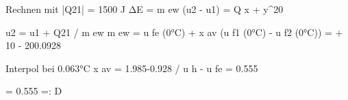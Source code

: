 Rechnen mit |Q21| = 1500 J  
ΔE = m ew (u2 - u1) = Q x + y^20  

u2 = u1 + Q21 / m ew  
m ew = u fe (0°C) + x av (u f1 (0°C) - u f2 (0°C)) = + 10 - 200.0928  

Interpol bei 0.063°C  
x av = 1.985-0.928 / u h - u fe = 0.555  

= 0.555 =: D
